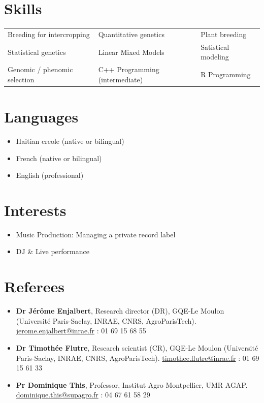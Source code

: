 \documentclass[10pt,a4paper]{article}
\begin{document}
\section{Skills}
{\small
\begin{tabularx}{\textwidth}{@{}>{\raggedright\arraybackslash}X >{\raggedright\arraybackslash}X >{\raggedright\arraybackslash}X@{}}
Breeding for intercropping & Quantitative genetics & Plant breeding\\[2pt]
Statistical genetics & Linear Mixed Models & Satistical modeling\\[2pt]
Genomic / phenomic selection & C++ Programming (intermediate) & R Programming\\
\end{tabularx}}

\section{Languages}
\begin{itemize}[label=\textbullet]
 \item Haitian creole (native or bilingual)
 \item French  (native or bilingual)
 \item English (professional)
\end{itemize}

\newpage
\section{Interests}
\begin{itemize}[label=\textbullet, itemsep=6pt]
\item Music Production: Managing a private record label \item DJ \& Live performance
\end{itemize}

\section{Referees}
\begin{itemize}[label=\textbullet, itemsep=6pt]
  \item \textbf{Dr Jérôme Enjalbert},  Research director (DR), GQE-Le Moulon (Université Paris-Saclay, INRAE, CNRS, AgroParisTech). \href{mailto:jerome.enjalbert@inrae.fr}{jerome.enjalbert@inrae.fr} : 01 69 15 68 55
  \item \textbf{Dr Timothée Flutre}, Research scientist (CR), GQE-Le Moulon (Université Paris-Saclay, INRAE, CNRS, AgroParisTech). \href{mailto:timothee.flutre@inrae.fr}{timothee.flutre@inrae.fr} : 01 69 15 61 33
  \item \textbf{Pr Dominique This}, Professor, Institut Agro Montpellier, UMR AGAP. \href{mailto:dominique.this@supagro.fr}{dominique.this@supagro.fr} : 04 67 61 58 29
\end{itemize}
\end{document}
